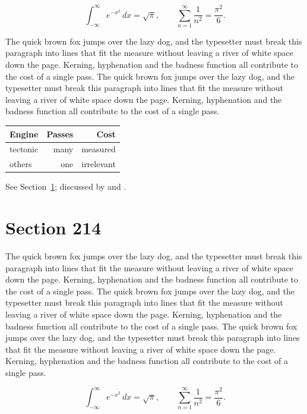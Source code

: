 \documentclass{article}
\begin{document}
\begin{equation}\label{eq:213}
\int_{-\infty}^{\infty} e^{-x^{2}}\,dx = \sqrt{\pi}, \qquad
\sum_{n=1}^{\infty} \frac{1}{n^{2}} = \frac{\pi^{2}}{6}.
\end{equation}

The quick brown fox jumps over the lazy dog, and the typesetter must break this paragraph into lines that fit the measure without leaving a river of white space down the page. Kerning, hyphenation and the badness function all contribute to the cost of a single pass. The quick brown fox jumps over the lazy dog, and the typesetter must break this paragraph into lines that fit the measure without leaving a river of white space down the page. Kerning, hyphenation and the badness function all contribute to the cost of a single pass. 

\begin{center}
\begin{tabular}{lrr}
\toprule
Engine & Passes & Cost \\
\midrule
tectonic & many & measured \\
others & one & irrelevant \\
\bottomrule
\end{tabular}
\end{center}

See Section~\ref{sec:214}; discussed by \textcite{k4} and \textcite{l1}.
\section{Section 214}
\label{sec:214}
The quick brown fox jumps over the lazy dog, and the typesetter must break this paragraph into lines that fit the measure without leaving a river of white space down the page. Kerning, hyphenation and the badness function all contribute to the cost of a single pass. The quick brown fox jumps over the lazy dog, and the typesetter must break this paragraph into lines that fit the measure without leaving a river of white space down the page. Kerning, hyphenation and the badness function all contribute to the cost of a single pass. The quick brown fox jumps over the lazy dog, and the typesetter must break this paragraph into lines that fit the measure without leaving a river of white space down the page. Kerning, hyphenation and the badness function all contribute to the cost of a single pass. 

\begin{equation}\label{eq:214}
\int_{-\infty}^{\infty} e^{-x^{2}}\,dx = \sqrt{\pi}, \qquad
\sum_{n=1}^{\infty} \frac{1}{n^{2}} = \frac{\pi^{2}}{6}.
\end{equation}
\end{document}
